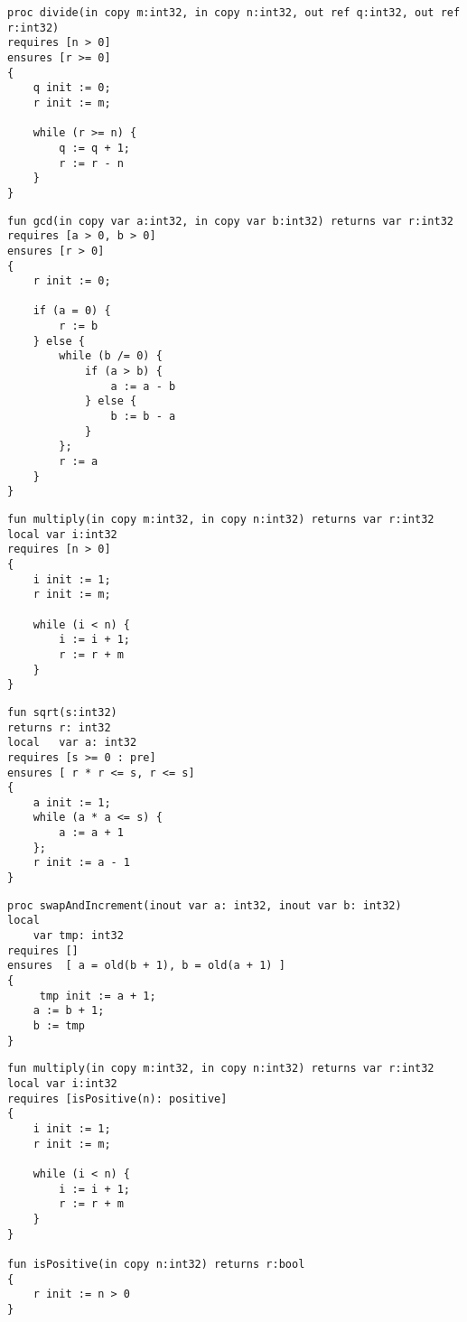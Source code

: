 
\begin{lstlisting}[caption=Pre-/postconditions in Prozeduren]
proc divide(in copy m:int32, in copy n:int32, out ref q:int32, out ref r:int32)
requires [n > 0]
ensures [r >= 0]
{
    q init := 0;
    r init := m;

    while (r >= n) {
        q := q + 1;
        r := r - n
    }
}
\end{lstlisting}

\begin{lstlisting}[caption=Pre-/postconditions in Funktionen mit mehreren Conditions]
fun gcd(in copy var a:int32, in copy var b:int32) returns var r:int32
requires [a > 0, b > 0]
ensures [r > 0]
{
    r init := 0;
    
    if (a = 0) {
        r := b
    } else {
        while (b /= 0) {
            if (a > b) {
                a := a - b
            } else {
                b := b - a
            }
        };
        r := a
    }
}
\end{lstlisting}

\begin{lstlisting}[caption=Pre-/postconditions in Funktionen]
fun multiply(in copy m:int32, in copy n:int32) returns var r:int32
local var i:int32
requires [n > 0]
{
    i init := 1;
    r init := m;

    while (i < n) {
        i := i + 1;
        r := r + m
    }
}
\end{lstlisting}

\begin{lstlisting}[caption=Berechnen einer ganzzahligen Quadratwurzel. Verwendung mehrerer Conditions]
fun sqrt(s:int32)
returns r: int32
local   var a: int32
requires [s >= 0 : pre]
ensures [ r * r <= s, r <= s]
{
    a init := 1;
    while (a * a <= s) {
        a := a + 1
    };      
    r init := a - 1
}
\end{lstlisting}

\begin{lstlisting}[caption=Evaluieren einer Expression im preexecution State]
proc swapAndIncrement(inout var a: int32, inout var b: int32)
local 
    var tmp: int32
requires []
ensures  [ a = old(b + 1), b = old(a + 1) ]
{
     tmp init := a + 1;
    a := b + 1;
    b := tmp
}
\end{lstlisting}

\begin{lstlisting}[caption=Pre-/postconditions mit Funktion in der Condition List]
fun multiply(in copy m:int32, in copy n:int32) returns var r:int32
local var i:int32
requires [isPositive(n): positive]
{
    i init := 1;
    r init := m;

    while (i < n) {
        i := i + 1;
        r := r + m
    }
}

fun isPositive(in copy n:int32) returns r:bool
{
    r init := n > 0
}
\end{lstlisting}

